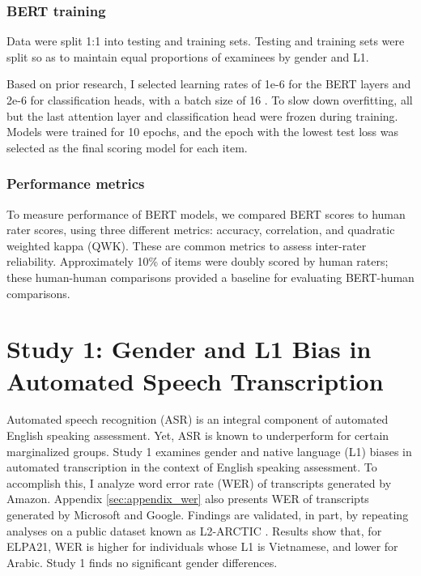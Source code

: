 \documentclass [PhD] {uclathes}
\begin{document}
\subsection{BERT training}

Data were split 1:1 into testing and training sets. Testing and training sets were split so as to maintain equal proportions of examinees by gender and L1. 

Based on prior research, I selected learning rates of 1e-6 for the BERT layers and 2e-6 for classification heads, with a batch size of 16 \citep{kwako2022using}. To slow down overfitting, all but the last attention layer and classification head were frozen during training. Models were trained for 10 epochs, and the epoch with the lowest test loss was selected as the final scoring model for each item. 

\subsection{Performance metrics}

To measure performance of BERT models, we compared BERT scores to human rater scores, using three different metrics: accuracy, correlation, and quadratic weighted kappa (QWK). These are common metrics to assess inter-rater reliability. Approximately 10\% of items were doubly scored by human raters; these human-human comparisons provided a baseline for evaluating BERT-human comparisons.



\chapter{Study 1: Gender and L1 Bias in Automated Speech Transcription}

Automated speech recognition (ASR) is an integral component of automated English speaking assessment. Yet, ASR is known to underperform for certain marginalized groups. Study 1 examines gender and native language (L1) biases in automated transcription in the context of English speaking assessment. To accomplish this, I analyze word error rate (WER) of transcripts generated by Amazon. Appendix \ref{sec:appendix_wer} also presents WER of transcripts generated by Microsoft and Google. Findings are validated, in part, by repeating analyses on a public dataset known as L2-ARCTIC \citep{zhao2018l2}. Results show that, for ELPA21, WER is higher for individuals whose L1 is Vietnamese, and lower for Arabic. Study 1 finds no significant gender differences.
\end{document}
